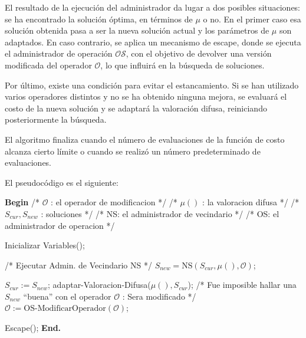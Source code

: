 El resultado de la ejecución del administrador da lugar a dos posibles situaciones: se ha encontrado la solución óptima, en términos de $\mu$ o no.
En el primer caso esa solución obtenida pasa a ser la nueva solución actual y los parámetros de $\mu$ son adaptados.
En caso contrario, se aplica un mecanismo de escape, donde se ejecuta el administrador de operación $\mathcal{OS}$, con el objetivo de devolver una versión modificada del operador $\mathcal{O}$, lo que influirá en la búsqueda de soluciones.

Por último, existe una condición para evitar el estancamiento. Si se han utilizado varios operadores distintos y no se ha obtenido ninguna mejora, se evaluará el costo de la nueva solución y se adaptará la valoración difusa, reiniciando posteriormente la búsqueda.

El algoritmo finaliza cuando el número de
evaluaciones de la función de costo alcanza
cierto límite o cuando se realizó un número
predeterminado de evaluaciones.

El pseudocódigo es el siguiente:

\begin{algorithm}
\caption{Procedimiento FANS}
\begin{algorithmic}[0] %

\State \textbf{Begin}
    \State \quad /* $\mathcal{O}$ : el operador de modificacion */
    \State \quad /* $\mu()$ : la valoracion difusa */
    \State \quad /* $S_{cur}, S_{new}$ : soluciones */
    \State \quad /* NS: el administrador de vecindario */
    \State \quad /* OS: el administrador de operacion */
    
    \State Inicializar Variables();
    
        \State /* Ejecutar Admin. de Vecindario NS */
        \State $S_{new} = \text{NS}(S_{cur}, \mu(), \mathcal{O})$;
        
            \State $S_{cur} := S_{new}$;
            \State adaptar-Valoracion-Difusa($\mu(), S_{cur}$);
        \Else
            \State /* Fue imposible hallar una $S_{new}$ ``buena'' 
            \State \quad con el operador $\mathcal{O}$ : Sera modificado */
            \State $\mathcal{O} := \text{OS-ModificarOperador}(\mathcal{O})$;
        \EndIf
        
            \State Escape();
        \EndIf
    \EndWhile
\State \textbf{End.}

\end{algorithmic}
\end{algorithm}


